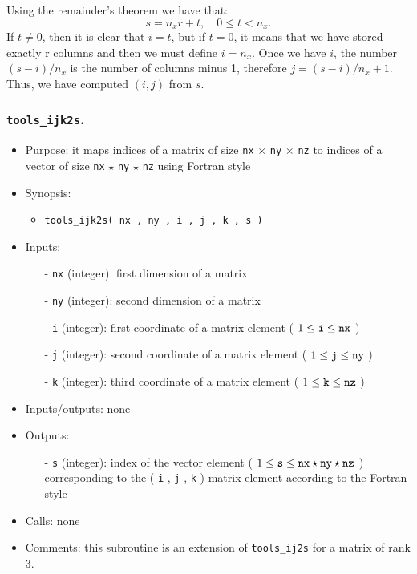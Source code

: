 \documentclass[12pt]{article}
\begin{document}
\begin{itemize}
\begin{equation}
\end{equation}
Using the remainder's theorem we have that:
\begin{equation}
s = n_x r + t, \quad 0 \leq t < n_x. 
\end{equation}
If $t \neq 0$, then it is clear that $i = t$, but if $t = 0$, it means that we have stored exactly r columns and then we must define $i = n_x$. Once we have $i$, the number $\left( s - i \right) / n_x$ is the number of columns minus 1, therefore $j = \left( s - i \right) / n_x + 1$. Thus, we have computed $\left(i,j\right)$ from $s$.
\end{itemize} 

\subsubsection{{\tt tools\_ijk2s}.}
\begin{itemize}
\item Purpose: it maps indices of a matrix of size {\tt nx} $\times$ {\tt ny} $\times$ {\tt nz} to indices of a vector of size {\tt nx} $\star$ {\tt ny} $\star$ {\tt nz} using Fortran style
\item Synopsis: 
\begin{itemize}
\item {\tt tools\_ijk2s( nx , ny , i , j , k , s )}
\end{itemize}
\item Inputs: 
\begin{itemize}
\item[-] {\tt nx} (integer): first dimension of a matrix
\item[-] {\tt ny} (integer): second dimension of a matrix
\item[-] {\tt i} (integer): first coordinate of a matrix element ( $1 \leq {\tt i} \leq {\tt nx}$ )
\item[-] {\tt j} (integer): second coordinate of a matrix element ( $1 \leq {\tt j} \leq {\tt ny}$ )
\item[-] {\tt k} (integer): third coordinate of a matrix element ( $1 \leq {\tt k} \leq {\tt nz}$ )
\end{itemize}
\item Inputs/outputs: none
\item Outputs:
\begin{itemize}
\item[-] {\tt s} (integer): index of the vector element ( $1 \leq {\tt s} \leq {\tt nx} \star {\tt ny} \star {\tt nz}$ ) corresponding to the ( {\tt i} , {\tt j} , {\tt k} ) matrix element according to the Fortran style
\end{itemize}
\item Calls: none
\item Comments: this subroutine is an extension of {\tt tools\_ij2s} for a matrix of rank $3$.
\end{itemize} 
\end{document}
